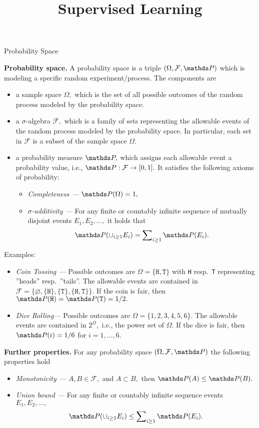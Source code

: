\documentclass[11pt,compress,t,notes=noshow, xcolor=table]{beamer}
\title{Supervised Learning}
\institute{\href{https://compstat-lmu.github.io/lecture_i2ml/}{compstat-lmu.github.io/lecture\_i2ml}}
\date{}
\begin{document}

\newcommand{\F}{\mathcal{F}}

\begin{vbframe}{Probability Space}
	
	\textbf{Probability space.} A probability space is a triple $(\Omega,\F,\P)$ which is modeling a specific random experiment/process.
		The components are
		\begin{itemize}
			\item a sample space $\Omega,$ which is the set of all possible outcomes of the random process modeled by the probability space.
			\item a $\sigma$-algebra $\F,$ which is a family of sets representing the allowable events of the random process modeled by the probability space.
			In particular, each set in $\F$ is a subset of the sample space $\Omega.$
			\item a probability measure $\P,$ which assigns each allowable event a probability value, i.e., $\P:\F\to[0,1].$ It satisfies the following axioms of probability:
			\begin{itemize}
				\item  \emph{Completeness ---} $\P(\Omega)=1,$  
				\item  \emph{$\sigma$-additivity ---} For any finite or countably infinite sequence of mutually disjoint events $E_1,E_2,\ldots,$ it holds that
				$$\P(\cup_{i\geq1}  E_i) = \sum\nolimits_{i\geq 1} \P(E_i).$$
			\end{itemize}
		\end{itemize}
		\framebreak
		Examples:
		\begin{itemize}
			\item \emph{Coin Tossing ---} Possible outcomes are $\Omega=\{\texttt{H},\texttt{T} \}$ with \texttt{H} resp.\ \texttt{T} representing ''heads'' resp.\ ''tails''. The allowable events are contained in $\F=\{\varnothing,  \{\texttt{H}\} , \{\texttt{T}\}, \{\texttt{H},\texttt{T}\}  \}.$ If the coin is fair, then $\P(\texttt{H})=\P(\texttt{T})=1/2.$
			\item \emph{Dice Rolling---} Possible outcomes are $\Omega=\{1,2,3,4,5,6\}.$  The allowable events are contained in $2^\Omega,$ i.e., the power set of $\Omega.$
			If the dice is fair, then $\P(i)=1/6$ for $i=1,\ldots,6.$
		\end{itemize}
		\textbf{Further properties.} For any probability space $(\Omega,\F,\P)$ the following properties hold
		\begin{itemize}
			\item \emph{Monotonicity ---} $A,B\in \F,$ and $A\subset B,$ then $\P(A)\leq \P(B).$
			\item \emph{Union bound ---}  For any finite or countably infinite sequence events $E_1,E_2,\ldots,$ 
			$$\P(\cup_{i\geq1}  E_i) \leq \sum\nolimits_{i\geq 1} \P(E_i).$$
		\end{itemize}

\end{vbframe}
\end{document}
